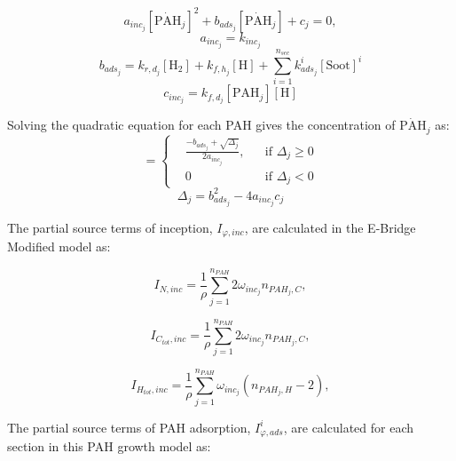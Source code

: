 \begin{equation}
	a_{inc_j}[\mathrm{\dot{PAH}}_j]^2+
	b_{ads_j}[\mathrm{\dot{PAH}}_j] + c_j = 0,
\end{equation}
\begin{equation}
	a_{inc_j}=k_{inc_j}
\end{equation}
\begin{equation}
	b_{ads_j}=k_{r,d_j}[\mathrm{H_2}]+k_{f,h_j}[\mathrm{H}]+\sum_{i=1}^{n_{sec}}k^i_{ads_j}[\mathrm{Soot}]^i
\end{equation}
\begin{equation}
	c_{inc_j}=k_{f,d_j}[\mathrm{PAH}_j][\mathrm{H}]
\end{equation}

Solving the quadratic equation for each PAH gives the concentration of $\mathrm{\mathrm{\dot{PAH}}}_j$ as:
\begin{equation}
	[\mathrm{\mathrm{\dot{PAH}}}_j]=
	\left\{
	\begin{aligned}
		&\frac{-b_{ads_j}+\sqrt{\Delta_j}}{2a_{inc_j}},
		&&
		\text{if } \Delta_j \ge 0
		\\
		& 0 
		&&
		\text{if } \Delta_j < 0
	\end{aligned}
	\right.
	\label{eqn:rad_ebri}
\end{equation}
\begin{equation}
	\Delta_j = b_{ads_j}^2-4a_{inc_j}c_{j}
	\label{eqn:delta_ebri}
\end{equation}

The partial source terms of inception, $I_{\varphi, inc}$, are calculated in the E-Bridge Modified model as: 

\begin{equation}
	I_{N,{inc}} = \frac{1}{\rho}
	\sum_{j=1}^{n_{PAH}}
	2\omega_{inc_{j}}
	n_{PAH_j,C}
	\label{eqn:IN_inc_ebri},
\end{equation}

\begin{equation}
	I_{C_{tot},{inc}} = \frac{1}{\rho}
	\sum_{j=1}^{n_{PAH}}
	2\omega_{inc_{j}} 
	n_{PAH_j,C}
	\label{eqn:ICtot_inc_ebri},
\end{equation}

\begin{equation}
	I_{H_{tot},{inc}} = \frac{1}{\rho}
	\sum_{j=1}^{n_{PAH}}
	\omega_{inc_{j}} 
	\left(
	n_{PAH_j,H}-2
	\right)
	\label{eqn:IHtot_inc_ebri},
\end{equation}


The partial source terms of PAH adsorption, $I^i_{\varphi, ads}$, are calculated for each section in this PAH growth model as: 

